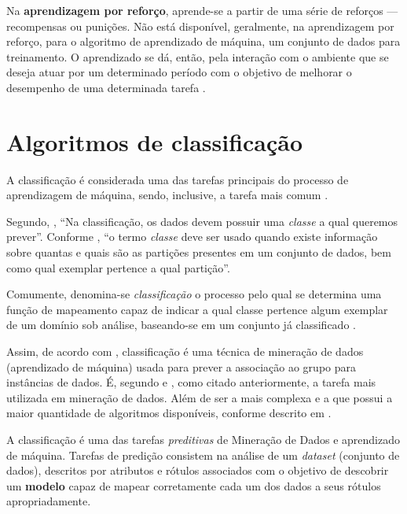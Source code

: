 Na \textbf{aprendizagem por reforço}, aprende-se a partir de uma série de reforços --- recompensas ou punições. Não está disponível, geralmente, na aprendizagem por reforço, para o algoritmo de aprendizado de máquina, um conjunto de dados para treinamento. O aprendizado se dá, então, pela interação com o ambiente que se deseja atuar por um determinado período com o objetivo de melhorar o desempenho de uma determinada tarefa \cite{Norvig2013} \cite{aprenda_mineracao_fernando_amaral16} \cite{silva_restaurante_2019}.

\section{Algoritmos de classificação}
A classificação é considerada uma das tarefas principais do processo de aprendizagem de máquina, sendo, inclusive, a tarefa mais comum \cite{amaral_introducao_2018} \cite{fayyad1996}.

Segundo, , ``Na classificação, os dados devem possuir uma \textit{classe} a qual queremos prever''. Conforme , ``o termo \textit{classe} deve ser usado quando existe informação sobre quantas e quais são as partições presentes em um conjunto de dados, bem como qual exemplar pertence a qual partição''.

Comumente, denomina-se \textit{classificação} o processo pelo qual se determina uma função de mapeamento capaz de indicar a qual classe pertence algum exemplar de um domínio sob análise, baseando-se em um conjunto já classificado \cite{Boscarioli2017}.

Assim, de acordo com , classificação é uma técnica de mineração de dados (aprendizado de máquina) usada para prever a associação ao grupo para instâncias de dados. É, segundo  e , como citado anteriormente, a tarefa mais utilizada em mineração de dados. Além de ser a mais complexa e a que possui a maior quantidade de algoritmos disponíveis, conforme descrito em .

A classificação é uma das tarefas \textit{preditivas} de Mineração de Dados e aprendizado de máquina. Tarefas de predição consistem na análise de um \textit{dataset} (conjunto de dados), descritos por atributos e rótulos associados com o objetivo de descobrir um \textbf{modelo} capaz de mapear corretamente cada um dos dados a seus rótulos apropriadamente. 

